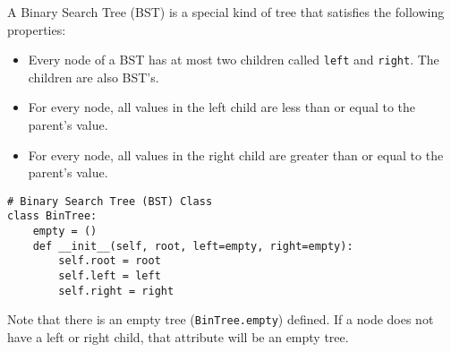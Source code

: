 A Binary Search Tree (BST) is a special kind of tree that satisfies the
following properties:
\begin{itemize}
\item Every node of a BST has at most two children called \texttt{left} and \texttt{right}. The children are also BST's.
\item For every node, all values in the left child are less than or equal to the parent's value.
\item For every node, all values in the right child are greater than or equal to the parent's value.
\end{itemize}

\begin{lstlisting}
# Binary Search Tree (BST) Class
class BinTree:
    empty = ()
    def __init__(self, root, left=empty, right=empty):
        self.root = root
        self.left = left
        self.right = right
\end{lstlisting}

Note that there is an empty tree (\texttt{BinTree.empty}) defined. If a node
does not have a left or right child, that attribute will be an empty tree.
